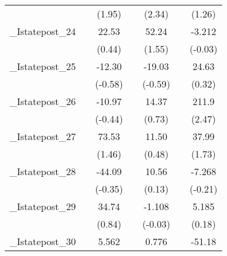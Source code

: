 {\begin{tabular}{l*{6}{c}}
            &                     &      (1.95)         &                     &      (2.34)         &                     &      (1.26)         \\
[1em]
\_Istatepost\_24&                     &       22.53         &                     &       52.24         &                     &      -3.212         \\
            &                     &      (0.44)         &                     &      (1.55)         &                     &     (-0.03)         \\
[1em]
\_Istatepost\_25&                     &      -12.30         &                     &      -19.03         &                     &       24.63         \\
            &                     &     (-0.58)         &                     &     (-0.59)         &                     &      (0.32)         \\
[1em]
\_Istatepost\_26&                     &      -10.97         &                     &       14.37         &                     &       211.9\sym{*}  \\
            &                     &     (-0.44)         &                     &      (0.73)         &                     &      (2.47)         \\
[1em]
\_Istatepost\_27&                     &       73.53         &                     &       11.50         &                     &       37.99         \\
            &                     &      (1.46)         &                     &      (0.48)         &                     &      (1.73)         \\
[1em]
\_Istatepost\_28&                     &      -44.09         &                     &       10.56         &                     &      -7.268         \\
            &                     &     (-0.35)         &                     &      (0.13)         &                     &     (-0.21)         \\
[1em]
\_Istatepost\_29&                     &       34.74         &                     &      -1.108         &                     &       5.185         \\
            &                     &      (0.84)         &                     &     (-0.03)         &                     &      (0.18)         \\
[1em]
\_Istatepost\_30&                     &       5.562         &                     &       0.776         &                     &      -51.18         \\

\end{tabular}}
